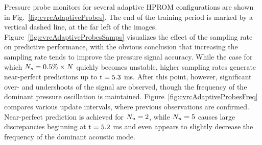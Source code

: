 Pressure probe monitors for several adaptive HPROM configurations are shown in Fig.~\ref{fig:cvrcAdaptiveProbes}. The end of the training period is marked by a vertical dashed line, at the far left of the images. Figure~\ref{fig:cvrcAdaptiveProbesSamps} visualizes the effect of the sampling rate on predictive performance, with the obvious conclusion that increasing the sampling rate tends to improve the pressure signal accuracy. While the case for which $N_s = 0.5\% \times N$ quickly becomes unstable, higher sampling rates generate near-perfect predictions up to $\text{t} = 5.3$ ms. After this point, however, significant over- and undershoots of the signal are observed, though the frequency of the dominant pressure oscillation is maintained. Figure~\ref{fig:cvrcAdaptiveProbesFreq} compares various update intervals, where previous observations are confirmed. Near-perfect prediction is achieved for $N_u = 2$, while $N_u = 5$ causes large discrepancies beginning at $\text{t} = 5.2$ ms and even appears to slightly decrease the frequency of the dominant acoustic mode.

